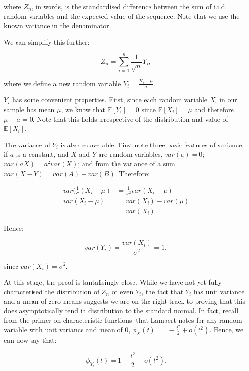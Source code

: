 \documentclass[
]{book}
\begin{document}
where \(Z_n\), in words, is the standardised difference between the sum of i.i.d. random variables and the expected value of the sequence. Note that we use the known variance in the denominator.

We can simplify this further:

\begin{equation}
Z_n = \sum_{i=1}^{n}\frac{1}{\sqrt{n}}Y_i,
\end{equation}

where we define a new random variable \(Y_i = \frac{X_i - \mu}{\sigma}.\)

\(Y_i\) has some convenient properties. First, since each random variable \(X_i\) in our sample has mean \(\mu\), we know that \(\mathbb{E}[Y_i] = 0\) since \(\mathbb{E}[X_i] = \mu\) and therefore \(\mu - \mu = 0\). Note that this holds irrespective of the distribution and value of \(\mathbb{E}[X_i]\).

The variance of \(Y_i\) is also recoverable. First note three basic features of variance: if \(a\) is a constant, and \(X\) and \(Y\) are random variables, \(var(a) = 0\); \(var(aX) = a^2var(X)\); and from the variance of a sum \(var(X - Y) = var(A)-var(B)\). Therefore:

\begin{align}
var(\frac{1}{\sigma}(X_i - \mu) &= \frac{1}{\sigma^2}var(X_i - \mu) \\
var(X_i - \mu) &= var(X_i) - var(\mu) \\
&= var(X_i).
\end{align}

Hence:

\begin{equation}
var(Y_i) = \frac{var(X_i)}{\sigma^2} = 1,
\end{equation}

since \(var(X_i) = \sigma^2\).

At this stage, the proof is tantalisingly close. While we have not yet fully characterised the distribution of \(Z_n\) or even \(Y_i\), the fact that \(Y_i\) has unit variance and a mean of zero means suggests we are on the right track to proving that this does asymptotically tend in distribution to the standard normal. In fact, recall from the primer on characteristic functions, that Lambert notes for any random variable with unit variance and mean of 0, \(\phi_X(t) = 1 - \frac{t^2}{2} + o(t^2)\). Hence, we can now say that:

\begin{equation}
\phi_{Y_i}(t) = 1 - \frac{t^2}{2} + o(t^2). \label{eq:cf_yi_simple}
\end{equation}
\end{document}

